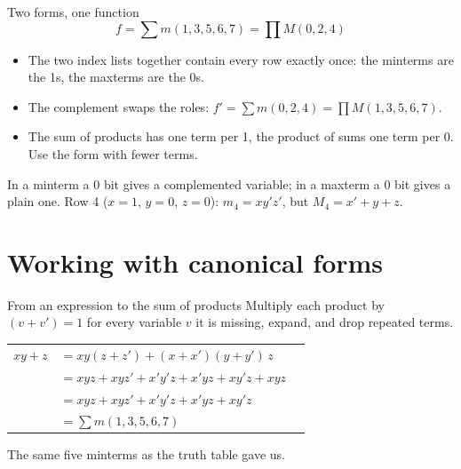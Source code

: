 \documentclass[10pt]{wosm-slides}
\makeatletter
\newenvironment{derivation}
  {\begin{tabular}{@{}r@{\;}l@{\qquad}l@{}}}
  {\end{tabular}}
\newcommand*\by[1]{\wosmlabel{#1}}
\makeatother
\begin{document}
\begin{frame}{Two forms, one function}
  \[
    f = \textstyle\sum m(1, 3, 5, 6, 7) = \prod M(0, 2, 4)
  \]

  \begin{itemize}
    \item The two index lists together contain every row exactly once: the minterms
      are the 1s, the maxterms are the 0s.
    \item The complement swaps the roles:
      $f' = \sum m(0, 2, 4) = \prod M(1, 3, 5, 6, 7)$.
    \item The sum of products has one term per 1, the product of sums one term per
      0. Use the form with fewer terms.
  \end{itemize}

  \begin{warning}
    In a minterm a 0 bit gives a complemented variable; in a maxterm a 0 bit gives
    a plain one. Row 4 ($x = 1$, $y = 0$, $z = 0$): $m_4 = xy'z'$, but
    $M_4 = x' + y + z$.
  \end{warning}
\end{frame}

\section{Working with canonical forms}

\begin{frame}{From an expression to the sum of products}
  Multiply each product by $(v + v') = 1$ for every variable $v$ it is missing,
  expand, and drop repeated terms.

  \medskip
  \small
  \begin{derivation}
    $xy + z$ & $= xy(z + z') + (x + x')(y + y')\,z$ & \by{complement, identity} \\
             & $= xyz + xyz' + x'y'z + x'yz + xy'z + xyz$ & \by{distributivity} \\
             & $= xyz + xyz' + x'y'z + x'yz + xy'z$ & \by{idempotence} \\
             & $= \sum m(1, 3, 5, 6, 7)$ & \\
  \end{derivation}

  \medskip
  \normalsize
  The same five minterms as the truth table gave us.
\end{frame}
\end{document}
